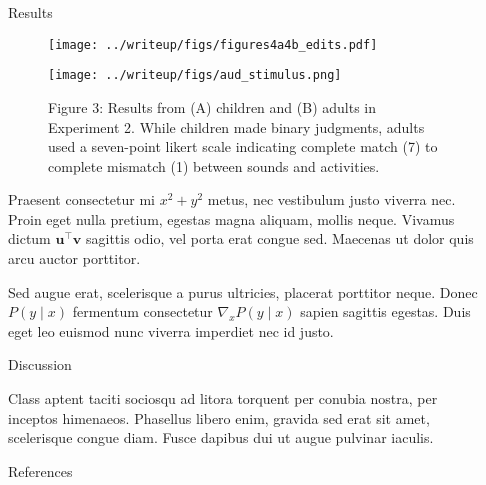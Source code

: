 \documentclass[final]{beamer}
\newlength{\sepwidth}
\newlength{\colwidth}
\newcommand{\separatorcolumn}{\begin{column}{\sepwidth}\end{column}}
\begin{document}
\begin{frame}[t]
\begin{columns}[t]
\begin{column}{\colwidth}
\begin{block}{Results}
    \begin{figure}
      \texttt{[image: ../writeup/figs/figures4a4b\_edits.pdf]}
    \end{figure}

    \vspace{-0.3in}

    \begin{figure}
      \texttt{[image: ../writeup/figs/aud\_stimulus.png]} \hspace{-1.5in}
      \caption{Figure 3: Results from (A) children and (B) adults in Experiment 2. While children made binary judgments, adults used a seven-point likert scale indicating complete match (7) to complete mismatch (1) between sounds and activities.}
    \end{figure}


    Praesent consectetur mi $x^2 + y^2$ metus, nec vestibulum justo viverra
    nec. Proin eget nulla pretium, egestas magna aliquam, mollis neque. Vivamus
    dictum $\mathbf{u}^\intercal\mathbf{v}$ sagittis odio, vel porta erat
    congue sed. Maecenas ut dolor quis arcu auctor porttitor.


    Sed augue erat, scelerisque a purus ultricies, placerat porttitor neque.
    Donec $P(y \mid x)$ fermentum consectetur $\nabla_x P(y \mid x)$ sapien
    sagittis egestas. Duis eget leo euismod nunc viverra imperdiet nec id
    justo.

  \end{block}

  \begin{block}{Discussion}

    Class aptent taciti sociosqu ad litora torquent per conubia nostra, per
    inceptos himenaeos. Phasellus libero enim, gravida sed erat sit amet,
    scelerisque congue diam. Fusce dapibus dui ut augue pulvinar iaculis.

  \end{block}

  \begin{block}{References}

    \nocite{*}
    \footnotesize{}

  \end{block}

\end{column}

\separatorcolumn
\end{columns}
\end{frame}
\end{document}
